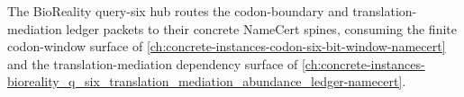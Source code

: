 The BioReality query-six hub routes the codon-boundary and translation-mediation ledger packets to their concrete NameCert spines, consuming the finite codon-window surface of \autoref{ch:concrete-instances-codon-six-bit-window-namecert} and the translation-mediation dependency surface of \autoref{ch:concrete-instances-bioreality_q_six_translation_mediation_abundance_ledger-namecert}.


